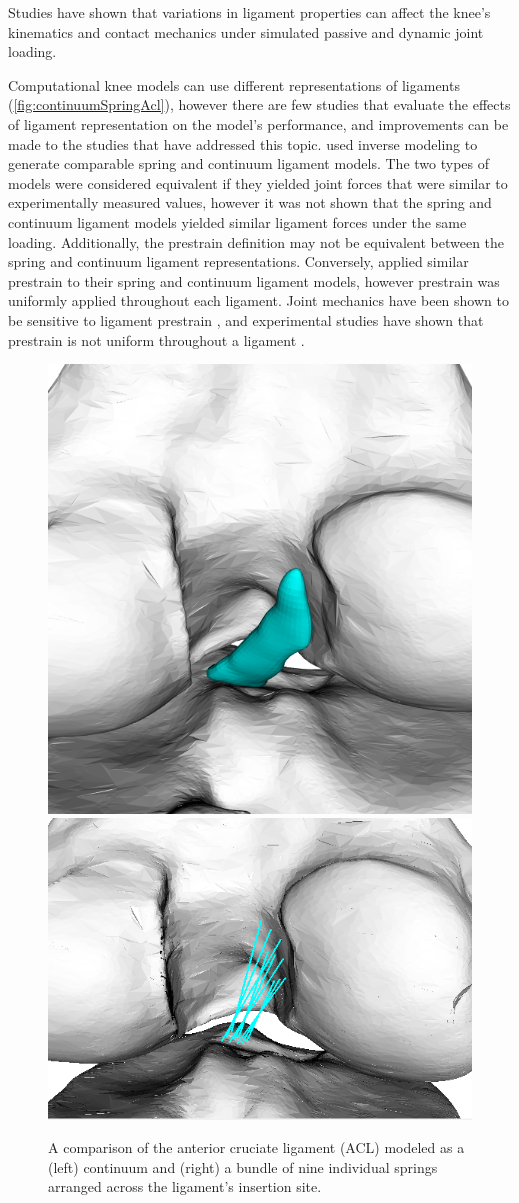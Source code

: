 Studies have shown that variations in ligament properties can affect the knee's kinematics and contact mechanics under simulated passive \citep{baldwin_efficient_2009,dhaher_effect_2010} and dynamic \citep{smith_influence_2016-1} joint loading.


Computational knee models can use different representations of ligaments (\autoref{fig:continuumSpringAcl}), however there are few studies that evaluate the effects of ligament representation on the model's performance, and improvements can be made to the studies that have addressed this topic. \cite{beidokhti_influence_2017} used inverse modeling to generate comparable spring and continuum ligament models. The two types of models were considered equivalent if they yielded joint forces that were similar to experimentally measured values, however it was not shown that the spring and continuum ligament models yielded similar ligament forces under the same loading. Additionally, the prestrain definition may not be equivalent between the spring and continuum ligament representations. Conversely, \cite{orozco_effect_2018} applied similar prestrain to their spring and continuum ligament models, however prestrain was uniformly applied throughout each ligament. Joint mechanics have been shown to be sensitive to ligament prestrain \citep{baldwin_efficient_2009}, and experimental studies have shown that prestrain is not uniform throughout a ligament \citep{hull_strain_1996,gardiner_strain_2001}.

\begin{figure}
    \centering
    \includegraphics[width=0.35\linewidth]{../img/Knee_ACL_Close.png}
    \includegraphics[width=0.35\linewidth]{../img/Knee_ACL_Springs_Close.png}
    \caption{A comparison of the anterior cruciate ligament (ACL) modeled as a (left) continuum and (right) a bundle of nine individual springs arranged across the ligament's insertion site.}
    \label{fig:continuumSpringAcl}
\end{figure}

